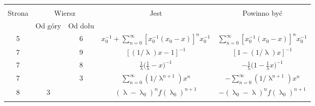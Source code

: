 \documentclass[a4paper,11pt]{article}
\renewcommand{\lambda}{\uplambda}
\begin{document}


\begin{center}

  \begin{tabular}{|c|c|c|c|c|}
    \hline
    & \multicolumn{2}{c|}{} & & \\
    Strona & \multicolumn{2}{c|}{Wiersz}& Jest
                              & Powinno być \\ \cline{2-3}
    & Od góry & Od dołu & & \\
    \hline
    5 & & 6 & $x_{ 0 }^{ -1 } + \sum\limits_{ n = 0 }^{ \infty }
              [ x_{ 0 }^{ -1 } ( x_{ 0 } - x ) ]^{ n } x_{ 0 }^{ -1 }$
           & $\sum\limits_{ n = 0 }^{ \infty } [ x_{ 0 }^{ -1 } ( x_{ 0 } - x ) ]^{ n }
             x_{ 0 }^{ -1 }$ \\
    7 & & 9 & $[ ( 1 / \lambda ) x - 1 ]^{ -1 }$
           & $[ 1 - ( 1 / \lambda ) x ]^{ -1 }$ \\
    7 & & 8 & $\frac{ 1 }{ \lambda } \big( \frac{ 1 }{ \lambda } - x \big)^{ -1 }$
           & $-\frac{ 1 }{ \lambda } \big( 1 - \frac{ 1 }{ \lambda } x \big)^{ -1 }$ \\
    7 & & 3 & $\sum\limits_{ n = 0 }^{ \infty } ( 1 / \lambda^{ n + 1 } ) x^{ n }$
           & $-\sum\limits_{ n = 0 }^{ \infty } ( 1 / \lambda^{ n + 1 } ) x^{ n }$ \\
    8 & 3 & & $( \lambda - \lambda_{ 0 } )^{ n } f( \lambda_{ 0 } )^{ n + 1 }$
           & $-( \lambda_{ 0 } - \lambda )^{ n } f( \lambda_{ 0 } )^{ n + 1 }$ \\
    & & & & \\
    \hline
  \end{tabular}

\end{center}

\VerSpaceSix
















{}






\end{document}
